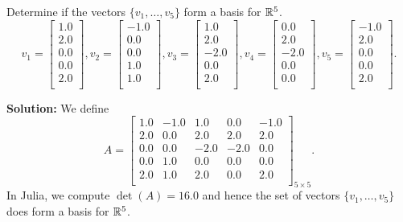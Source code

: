 \vspace*{.2cm}

\begin{example}
\label{ex:BasisR5} 
Determine if the vectors $\{v_1, \ldots, v_5\}$ form a basis for $\mathbb R^5$.
\begin{equation}
    \label{eq:NonorthognalBasis3R5}
    v_1=  \left[
\begin{array}{r}
1.0 \\
2.0 \\
0.0 \\
0.0 \\
2.0 \\
\end{array}
\right], v_2=\left[
\begin{array}{r}
-1.0 \\
0.0 \\
0.0 \\
1.0 \\
1.0 \\
\end{array}
\right], v_3= \left[
\begin{array}{r}
1.0 \\
2.0 \\
-2.0 \\
0.0 \\
2.0 \\
\end{array}
\right], v_4=\left[
\begin{array}{r}
0.0 \\
2.0 \\
-2.0 \\
0.0 \\
0.0 \\
\end{array}
\right], v_5=\left[
\begin{array}{r}
-1.0 \\
2.0 \\
0.0 \\
0.0 \\
2.0 \\
\end{array}
\right].
\end{equation}
 \end{example}

\textbf{Solution:}
We define
\begin{equation}
\label{eq:5by5matrix}
  A= \left[
\begin{array}{rrrrr}
1.0 & -1.0 & 1.0 & 0.0 & -1.0 \\
2.0 & 0.0 & 2.0 & 2.0 & 2.0 \\
0.0 & 0.0 & -2.0 & -2.0 & 0.0 \\
0.0 & 1.0 & 0.0 & 0.0 & 0.0 \\
2.0 & 1.0 & 2.0 & 0.0 & 2.0 \\
\end{array}
\right]_{5 \times 5} .
\end{equation}
In Julia, we compute $\det(A)=16.0$ and hence the set of vectors $\{v_1, \ldots, v_5\}$ does form a basis for $\mathbb R^5$.

